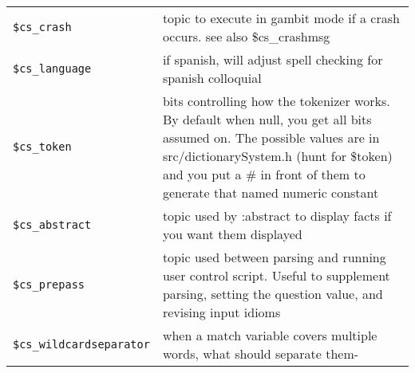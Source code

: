 \documentclass[]{article}
\begin{document}
\begin{longtable}[]{@{}ll@{}}
\begin{minipage}[t]{0.26\columnwidth}
\texttt{\$cs\_crash}\strut
\end{minipage} & \begin{minipage}[t]{0.10\columnwidth}\raggedright\strut
topic to execute in gambit mode if a crash occurs. see also
\$cs\_crashmsg\strut
\end{minipage}\tabularnewline
\begin{minipage}[t]{0.26\columnwidth}\raggedright\strut
\texttt{\$cs\_language}\strut
\end{minipage} & \begin{minipage}[t]{0.10\columnwidth}\raggedright\strut
if spanish, will adjust spell checking for spanish colloquial\strut
\end{minipage}\tabularnewline
\begin{minipage}[t]{0.26\columnwidth}\raggedright\strut
\texttt{\$cs\_token}\strut
\end{minipage} & \begin{minipage}[t]{0.10\columnwidth}\raggedright\strut
bits controlling how the tokenizer works. By default when null, you get
all bits assumed on. The possible values are in src/dictionarySystem.h
(hunt for \$token) and you put a \# in front of them to generate that
named numeric constant\strut
\end{minipage}\tabularnewline
\begin{minipage}[t]{0.26\columnwidth}\raggedright\strut
\texttt{\$cs\_abstract}\strut
\end{minipage} & \begin{minipage}[t]{0.10\columnwidth}\raggedright\strut
topic used by :abstract to display facts if you want them
displayed\strut
\end{minipage}\tabularnewline
\begin{minipage}[t]{0.26\columnwidth}\raggedright\strut
\texttt{\$cs\_prepass}\strut
\end{minipage} & \begin{minipage}[t]{0.10\columnwidth}\raggedright\strut
topic used between parsing and running user control script. Useful to
supplement parsing, setting the question value, and revising input
idioms\strut
\end{minipage}\tabularnewline
\begin{minipage}[t]{0.26\columnwidth}\raggedright\strut
\texttt{\$cs\_wildcardseparator}\strut
\end{minipage} & \begin{minipage}[t]{0.10\columnwidth}\raggedright\strut
when a match variable covers multiple words, what should separate them-

\end{minipage}
\end{longtable}
\end{document}

